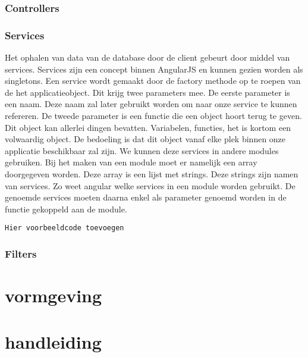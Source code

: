 \documentclass[a4paper,11pt]{article}
\begin{document}
\subsubsection{Controllers}

\subsubsection{Services}
Het ophalen van data van de database door de client gebeurt door middel van services. Services zijn een concept binnen AngularJS en kunnen gezien worden als singletons. Een service wordt gemaakt door de factory methode op te roepen van de het applicatieobject. Dit krijg twee parameters mee. De eerste parameter is een naam. Deze naam zal later gebruikt worden om naar onze service te kunnen refereren. De tweede parameter is een functie die een object hoort terug te geven. Dit object kan allerlei dingen bevatten. Variabelen, functies, het is kortom een volwaardig object. De bedoeling is dat dit object vanaf elke plek binnen onze applicatie beschikbaar zal zijn. We kunnen deze services in andere modules gebruiken. Bij het maken van een module moet er namelijk een array doorgegeven worden. Deze array is een lijst met strings. Deze strings zijn namen van services. Zo weet angular welke services in een module worden gebruikt. De genoemde services moeten daarna enkel als parameter genoemd worden in de functie gekoppeld aan de module.

\begin{verbatim}
Hier voorbeeldcode toevoegen
\end{verbatim}

\subsubsection{Filters}

\section{vormgeving}



\section{handleiding}
\end{document}
